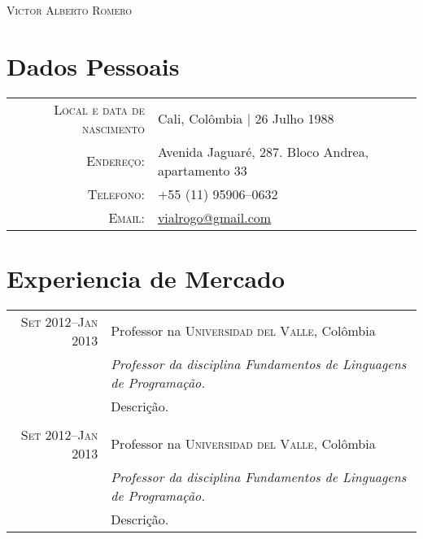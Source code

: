 \documentclass[a4paper,10pt]{article}
\begin{document}
\pagestyle{empty} %

\par{\centering
  {\Huge \textsc{Victor Alberto Romero}
	}\bigskip\par}

\section{Dados Pessoais}

\begin{tabular}{rl}
  \textsc{Local e data de nascimento} & Cali, Colômbia  | 26 Julho 1988 \\
  \textsc{Endereço:}                  & Avenida Jaguaré, 287. Bloco Andrea, apartamento 33 \\
  \textsc{Telefono:}                  & +55 (11) 95906--0632 \\
  \textsc{Email:}                     & \href{mailto:vialrogo@gmail.com}{vialrogo@gmail.com}
\end{tabular}

\section{Experiencia de Mercado}
\begin{tabular}{rl}

  \textsc{Set 2012--Jan 2013} & Professor na \textsc{Universidad del Valle}, Colômbia \\
                              &\emph{Professor da disciplina Fundamentos de Linguagens de Programação.} \\
                              &\footnotesize{Descrição.} \\
  
  \multicolumn{2}{c}{} \\

  \textsc{Set 2012--Jan 2013} & Professor na \textsc{Universidad del Valle}, Colômbia \\
                              &\emph{Professor da disciplina Fundamentos de Linguagens de Programação.} \\
                              &\footnotesize{Descrição.} \\

\end{tabular}
\end{document}
